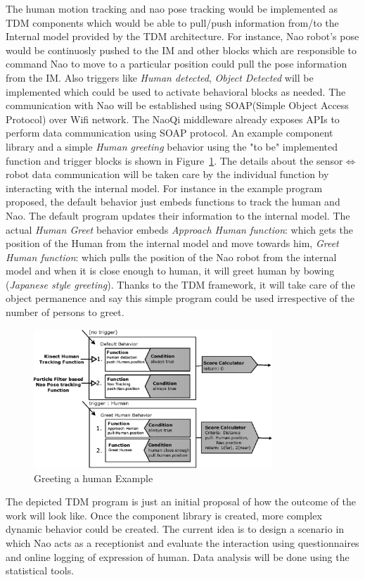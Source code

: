 	The human motion tracking and nao pose tracking would be implemented as TDM components which would be able to pull/push information from/to the Internal model provided by the TDM architecture. For instance, Nao robot's pose would be continuosly pushed to the IM and other blocks which are responsible to command Nao to move to a particular position could pull the pose information from the IM. Also triggers like \emph{Human detected}, \emph{Object Detected} will be implemented which could be used to activate behavioral blocks as needed. The communication with Nao will be established using SOAP(Simple Object Access Protocol)\cite{SoapSpec} over Wifi network. The NaoQi middleware already exposes APIs to perform data communication using SOAP protocol. An example component library and a simple \emph{Human greeting} behavior using the "to be" implemented function and trigger blocks is shown in Figure~\ref{fig:program}. The details about the sensor$\Leftrightarrow$robot data communication will be taken care by the individual function by interacting with the internal model. For instance in the example program proposed, the default behavior just embeds functions to track the human and Nao. The default program updates their information to the internal model. The actual \emph{Human Greet} behavior embeds \emph{Approach Human function}: which gets the position of the Human from the internal model and move towards him, \emph{Greet Human function}: which pulls the position of the Nao robot from the internal model and when it is close enough to human, it will greet human by bowing (\emph{Japanese style greeting}). Thanks to the TDM framework, it will take care of the object permanence and say this simple program could be used irrespective of the number of persons to greet.
\begin{figure}
\centering
\includegraphics[width=0.8\textwidth]{assets/tdm_example_proposed.eps}
\caption{Greeting a human Example}
\label{fig:program}
\end{figure}	
	The depicted TDM program is just an initial proposal of how the outcome of the work will look like. Once the component library is created, more complex dynamic behavior could be created. The current idea is to design a scenario in which Nao acts as a receptionist and evaluate the interaction using questionnaires and online logging of expression of human. Data analysis will be done using the statistical tools.
